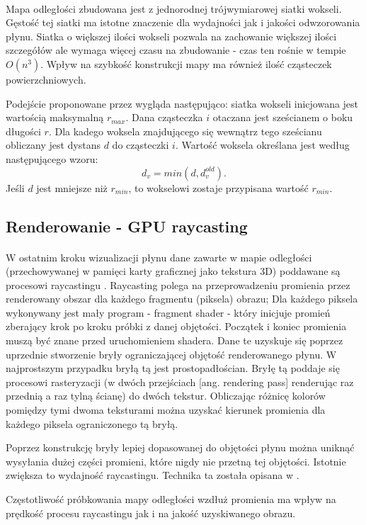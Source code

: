\paragraph{}
Mapa odległości zbudowana jest z jednorodnej trójwymiarowej siatki wokseli. Gęstość tej siatki ma istotne znaczenie dla wydajności jak i jakości odwzorowania płynu. Siatka o większej ilości wokseli pozwala na zachowanie większej ilości szczegółów ale wymaga więcej czasu na zbudowanie - czas ten rośnie w tempie $O(n^3)$. Wpływ na szybkość konstrukcji mapy ma również ilość cząsteczek powierzchniowych.
\par
Podejście proponowane przez \cite{goswami10} wygląda następująco: siatka wokseli inicjowana jest wartością maksymalną $r_{max}$. Dana cząsteczka $i$ otaczana jest sześcianem o boku długości $r$. Dla kadego woksela znajdującego się wewnątrz tego sześcianu obliczany jest dystans $d$ do cząsteczki $i$. Wartość woksela określana jest według następującego wzoru:
\begin{equation}
d_v = min(d, d_v^{old}).
\label{eqn:distance_field}
\end{equation}
Jeśli $d$ jest mniejsze niż $r_{min}$, to wokselowi zostaje przypisana wartość $r_{min}$.
\par


\subsection{Renderowanie - GPU raycasting}

\paragraph{}
W ostatnim kroku wizualizacji płynu dane zawarte w mapie odległości (przechowywanej w pamięci karty graficznej jako tekstura 3D) poddawane są procesowi raycastingu \cite{hadwiger05}. Raycasting polega na przeprowadzeniu promienia przez renderowany obszar dla każdego fragmentu (piksela) obrazu; Dla każdego piksela wykonywany jest mały program - fragment shader - który inicjuje promień zberający krok po kroku próbki z danej objętości. Początek i koniec promienia muszą być znane przed uruchomieniem shadera. Dane te uzyskuje się poprzez uprzednie stworzenie bryły ograniczającej objętość renderowanego płynu. W najprostszym przypadku bryłą tą jest prostopadłościan. Bryłę tą poddaje się procesowi rasteryzacji (w dwóch przejściach [ang. rendering pass] renderując raz przednią a raz tylną ścianę) do dwóch tekstur. Obliczając różnicę kolorów pomiędzy tymi dwoma teksturami można uzyskać kierunek promienia dla każdego piksela ograniczonego tą bryłą.
\par
Poprzez konstrukcję bryły lepiej dopasowanej do objętości płynu można uniknąć wysyłania dużej części promieni, które nigdy nie przetną tej objętości. Istotnie zwiększa to wydajność raycastingu. Technika ta została opisana w \cite{@haferburg}.
\par
Częstotliwość próbkowania mapy odległości wzdłuż promienia ma wpływ na prędkość procesu raycastingu jak i na jakość uzyskiwanego obrazu.
\par